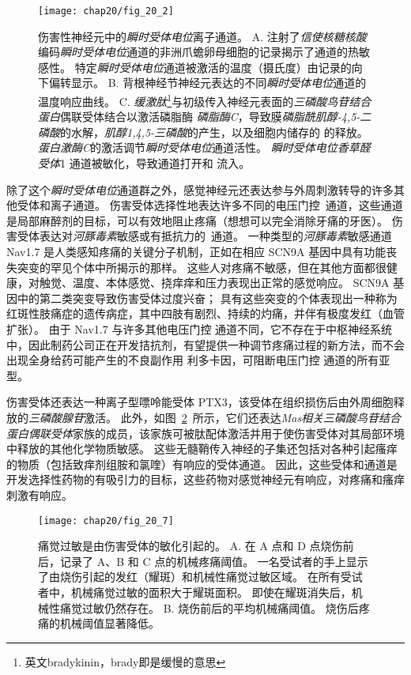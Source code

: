 \begin{figure}[htbp]
	\centering
	\texttt{[image: chap20/fig\_20\_2]}
	\caption{伤害性神经元中的\textit{瞬时受体电位}离子通道。
		A. 注射了\textit{信使核糖核酸}编码\textit{瞬时受体电位}通道的非洲爪蟾卵母细胞的记录揭示了通道的热敏感性。
		特定\textit{瞬时受体电位}通道被激活的温度（摄氏度）由记录的向下偏转显示\cite{tominaga2004thermosensation}。
		B. 背根神经节神经元表达的不同\textit{瞬时受体电位}通道的温度响应曲线\cite{jordt2003lessons}。
		C. \textit{缓激肽}\footnote{英文bradykinin，brady即是缓慢的意思}与初级传入神经元表面的\textit{三磷酸鸟苷结合蛋白}偶联受体结合以激活磷脂酶 \textit{磷脂酶C}，导致膜\textit{磷脂酰肌醇-4,5-二磷酸}的水解，\textit{肌醇1,4,5-三磷酸}的产生，以及细胞内储存的  的释放。
		\textit{蛋白激酶C}的激活调节\textit{瞬时受体电位}通道活性。 
		\textit{瞬时受体电位香草醛受体}1 通道被敏化，导致通道打开和  流入\cite{bautista2006trpa1}。}
	\label{fig:20_2}
\end{figure}


除了这个\textit{瞬时受体电位}通道群之外，感觉神经元还表达参与外周刺激转导的许多其他受体和离子通道。
伤害受体选择性地表达许多不同的电压门控~通道，这些通道是局部麻醉剂的目标，可以有效地阻止疼痛（想想可以完全消除牙痛的牙医）。
伤害受体表达对\textit{河豚毒素}敏感或有抵抗力的~通道。
一种类型的\textit{河豚毒素}敏感通道 Nav1.7 是人类感知疼痛的关键分子机制，正如在相应 SCN9A 基因中具有功能丧失突变的罕见个体中所揭示的那样。
这些人对疼痛不敏感，但在其他方面都很健康，对触觉、温度、本体感觉、挠痒痒和压力表现出正常的感觉响应。 
SCN9A 基因中的第二类突变导致伤害受体过度兴奋； 具有这些突变的个体表现出一种称为红斑性肢痛症的遗传病症，其中四肢有剧烈、持续的灼痛，并伴有极度发红（血管扩张）。
由于 Nav1.7 与许多其他电压门控  通道不同，它不存在于中枢神经系统中，因此制药公司正在开发拮抗剂，有望提供一种调节疼痛过程的新方法，而不会出现全身给药可能产生的不良副作用 利多卡因，可阻断电压门控  通道的所有亚型。


伤害受体还表达一种离子型嘌呤能受体 PTX3，该受体在组织损伤后由外周细胞释放的\textit{三磷酸腺苷}激活。
此外，如图~\ref{fig:20_7}~所示，它们还表达\textit{Mas相关三磷酸鸟苷结合蛋白偶联受体}家族的成员，该家族可被肽配体激活并用于使伤害受体对其局部环境中释放的其他化学物质敏感。
这些无髓鞘传入神经的子集还包括对各种引起瘙痒的物质（包括致痒剂组胺和氯喹）有响应的受体通道。
因此，这些受体和通道是开发选择性药物的有吸引力的目标，这些药物对感觉神经元有响应，对疼痛和瘙痒刺激有响应。


\begin{figure}[htbp]
	\centering
	\texttt{[image: chap20/fig\_20\_7]}
	\caption{痛觉过敏是由伤害受体的敏化引起的\cite{raja1984evidence}。
		A. 在 A 点和 D 点烧伤前后，记录了 A、B 和 C 点的机械疼痛阈值。
		一名受试者的手上显示了由烧伤引起的发红（耀斑）和机械性痛觉过敏区域。
		在所有受试者中，机械痛觉过敏的面积大于耀斑面积。
		即使在耀斑消失后，机械性痛觉过敏仍然存在。
		B. 烧伤前后的平均机械痛阈值。
		烧伤后疼痛的机械阈值显著降低。}
	\label{fig:20_7}
\end{figure}


